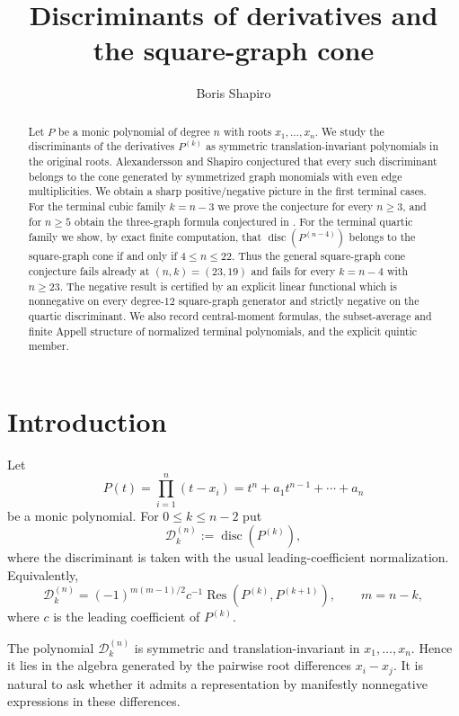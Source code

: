 \documentclass[11pt]{amsart}
\title[Discriminants and square-graph cones]
{Discriminants of derivatives and the square-graph cone}
\author{Boris Shapiro}
\numberwithin{equation}{section}
\newcommand{\D}{\mathcal D}
\newcommand{\Res}{\operatorname{Res}}
\newcommand{\disc}{\operatorname{disc}}
\begin{document}
\begin{abstract}
Let $P$ be a monic polynomial of degree $n$ with roots $x_1,\ldots,x_n$.
We study the discriminants of the derivatives $P^{(k)}$ as symmetric
translation-invariant polynomials in the original roots.  Alexandersson and
Shapiro conjectured that every such discriminant belongs to the cone generated
by symmetrized graph monomials with even edge multiplicities.  We obtain a
sharp positive/negative picture in the first terminal cases.  For the terminal
cubic family $k=n-3$ we prove the conjecture for every $n\ge3$, and for
$n\ge5$ obtain the three-graph formula conjectured in \cite[Example~3]{AS}.
For the terminal quartic family we show, by exact finite computation, that
$\disc(P^{(n-4)})$ belongs to the square-graph cone if and only if
$4\le n\le22$.  Thus the general square-graph cone conjecture fails already
at $(n,k)=(23,19)$ and fails for every $k=n-4$ with $n\ge23$.  The negative
result is certified by an explicit linear functional which is nonnegative on
every degree-$12$ square-graph generator and strictly negative on the quartic
discriminant.  We also record central-moment formulas, the subset-average and
finite Appell structure of normalized terminal polynomials, and the explicit
quintic member.
\end{abstract}



\maketitle

\section{Introduction}

Let
\[
P(t)=\prod_{i=1}^n(t-x_i)=t^n+a_1t^{n-1}+\cdots+a_n
\]
be a monic polynomial.  For $0\le k\le n-2$ put
\[
\D_k^{(n)}:=\disc(P^{(k)}),
\]
where the discriminant is taken with the usual leading-coefficient
normalization.
Equivalently,
\[
\D_k^{(n)}=(-1)^{m(m-1)/2}c^{-1}\Res(P^{(k)},P^{(k+1)}),\qquad
m=n-k,
\]
where $c$ is the leading coefficient of $P^{(k)}$.

The polynomial $\D_k^{(n)}$ is symmetric and translation-invariant in
$x_1,\ldots,x_n$.  Hence it lies in the algebra generated by the pairwise
root differences $x_i-x_j$.  It is natural to ask whether it admits a
representation by manifestly nonnegative expressions in these differences.
\end{document}
